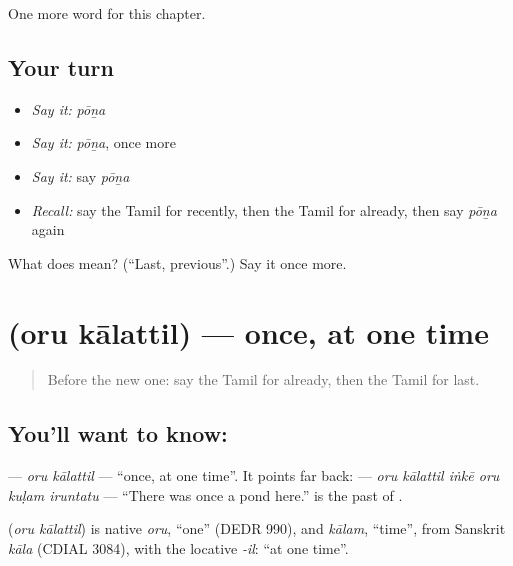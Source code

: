 \begin{grammarlens}[title={What you've built}]
One more word for this chapter.
\end{grammarlens}

\subsection*{Your turn}
\begin{itemize}
\raggedright
  \item \emph{Say it:} \emph{pōṉa}
  \item \emph{Say it:} \emph{pōṉa}, once more
  \item \emph{Say it:} say \emph{pōṉa}
  \item \emph{Recall:} say the Tamil for recently, then the Tamil for already, then say \emph{pōṉa} again
\end{itemize}

\begin{tcolorbox}[breakable,colback=teal!4,colframe=teal!35!black,title={Before you move on}]
What does  mean? (\textquotedblleft{}Last, previous\textquotedblright{}.) Say it once more.
\end{tcolorbox}
\section[\texorpdfstring{\ta{ஒரு} \ta{காலத்தில்} (oru kālattil)}{ஒரு காலத்தில் (oru kālattil)}]{  (oru kālattil) — once, at one time}

\label{lesson:TA-C158-oru-kalattil}



\begin{quote}
Before the new one: say the Tamil for already, then the Tamil for last.
\end{quote}

\subsection*{You'll want to know:  }
\textbf{ } — \emph{oru kālattil} — \textquotedblleft{}once, at one time\textquotedblright{}. It points far back: \textbf{     } — \emph{oru kālattil iṅkē oru kuḷam iruntatu} — \textquotedblleft{}There was once a pond here.\textquotedblright{} \textbf{} is the past of \textbf{}.

\begin{cousinweb}
\textbf{ } (\emph{oru kālattil}) is native \emph{oru}, \textquotedblleft{}one\textquotedblright{} (DEDR 990), and \emph{kālam}, \textquotedblleft{}time\textquotedblright{}, from Sanskrit \emph{kāla} (CDIAL 3084), with the locative \emph{-il}: \textquotedblleft{}at one time\textquotedblright{}.
\end{cousinweb}

